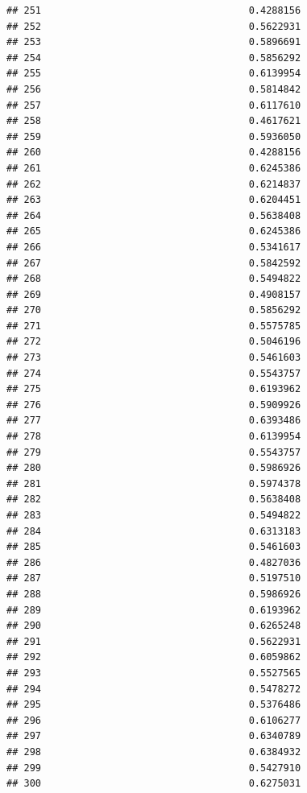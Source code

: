 \documentclass[
  american,
  man,floatsintext]{apa7}
\begin{document}
\begin{verbatim}
## 251                                    0.4288156
## 252                                    0.5622931
## 253                                    0.5896691
## 254                                    0.5856292
## 255                                    0.6139954
## 256                                    0.5814842
## 257                                    0.6117610
## 258                                    0.4617621
## 259                                    0.5936050
## 260                                    0.4288156
## 261                                    0.6245386
## 262                                    0.6214837
## 263                                    0.6204451
## 264                                    0.5638408
## 265                                    0.6245386
## 266                                    0.5341617
## 267                                    0.5842592
## 268                                    0.5494822
## 269                                    0.4908157
## 270                                    0.5856292
## 271                                    0.5575785
## 272                                    0.5046196
## 273                                    0.5461603
## 274                                    0.5543757
## 275                                    0.6193962
## 276                                    0.5909926
## 277                                    0.6393486
## 278                                    0.6139954
## 279                                    0.5543757
## 280                                    0.5986926
## 281                                    0.5974378
## 282                                    0.5638408
## 283                                    0.5494822
## 284                                    0.6313183
## 285                                    0.5461603
## 286                                    0.4827036
## 287                                    0.5197510
## 288                                    0.5986926
## 289                                    0.6193962
## 290                                    0.6265248
## 291                                    0.5622931
## 292                                    0.6059862
## 293                                    0.5527565
## 294                                    0.5478272
## 295                                    0.5376486
## 296                                    0.6106277
## 297                                    0.6340789
## 298                                    0.6384932
## 299                                    0.5427910
## 300                                    0.6275031

\end{verbatim}
\end{document}
